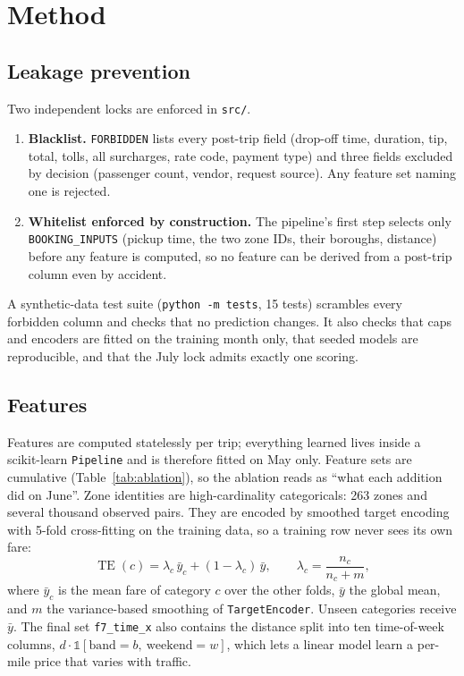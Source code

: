 \documentclass[11pt,a4paper]{article}
\newcommand{\code}[1]{\texttt{#1}}
\begin{document}
\section{Method}\label{sec:method}
\subsection{Leakage prevention}\label{sec:leak}
Two independent locks are enforced in \code{src/}.
\begin{enumerate}
  \item \textbf{Blacklist.} \code{FORBIDDEN} lists every post-trip field (drop-off time, duration, tip, total, tolls, all surcharges, rate code, payment type) and three fields excluded by decision (passenger count, vendor, request source). Any feature set naming one is rejected.
  \item \textbf{Whitelist enforced by construction.} The pipeline's first step selects only \code{BOOKING\_INPUTS} (pickup time, the two zone IDs, their boroughs, distance) before any feature is computed, so no feature can be derived from a post-trip column even by accident.
\end{enumerate}
A synthetic-data test suite (\code{python -m tests}, 15 tests) scrambles every forbidden column and checks that no prediction changes. It also checks that caps and encoders are fitted on the training month only, that seeded models are reproducible, and that the July lock admits exactly one scoring.

\subsection{Features}
Features are computed statelessly per trip; everything learned lives inside a scikit-learn \code{Pipeline} \cite{sklearn} and is therefore fitted on May only. Feature sets are cumulative (Table~\ref{tab:ablation}), so the ablation reads as ``what each addition did on June''. Zone identities are high-cardinality categoricals: 263 zones and several thousand observed pairs. They are encoded by smoothed target encoding \cite{micci} with 5-fold cross-fitting on the training data, so a training row never sees its own fare:
\begin{equation}
  \operatorname{TE}(c) = \lambda_c\,\bar y_c + (1-\lambda_c)\,\bar y, \qquad \lambda_c = \frac{n_c}{n_c + m},
\end{equation}
where $\bar y_c$ is the mean fare of category $c$ over the other folds, $\bar y$ the global mean, and $m$ the variance-based smoothing of \code{TargetEncoder}. Unseen categories receive $\bar y$. The final set \code{f7\_time\_x} also contains the distance split into ten time-of-week columns, $d\cdot\mathbb 1[\text{band}=b,\ \text{weekend}=w]$, which lets a linear model learn a per-mile price that varies with traffic.
\end{document}
